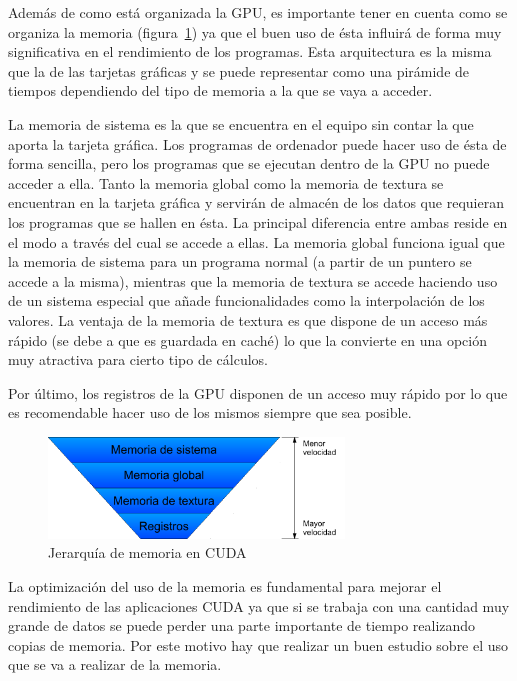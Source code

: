 Además de como está organizada la GPU, es importante tener en cuenta como se organiza la memoria (figura~\ref{fig:memcuda}) ya que el buen uso de ésta influirá de forma muy significativa en el rendimiento de los programas. Esta arquitectura es la misma que la de las tarjetas gráficas y se puede representar como una pirámide de tiempos dependiendo del tipo de memoria a la que se vaya a acceder.

La memoria de sistema es la que se encuentra en el equipo sin contar la que aporta la tarjeta gráfica. Los programas de ordenador puede hacer uso de ésta de forma sencilla, pero los programas que se ejecutan dentro de la GPU no puede acceder a ella. Tanto la memoria global como la memoria de textura se encuentran en la tarjeta gráfica y servirán de almacén de los datos que requieran los programas que se hallen en ésta. La principal diferencia entre ambas reside en el modo a través del cual se accede a ellas. La memoria global funciona igual que la memoria de sistema para un programa normal (a partir de un puntero se accede a la misma), mientras que la memoria de textura se accede haciendo uso de un sistema especial que añade funcionalidades como la interpolación de los valores. La ventaja de la memoria de textura es que dispone de un acceso más rápido (se debe a que es guardada en caché) lo que la convierte en una opción muy atractiva para cierto tipo de cálculos.

Por último, los registros de la GPU disponen de un acceso muy rápido por lo que es recomendable hacer uso de los mismos siempre que sea posible.

\begin{figure}
	\centering
	\includegraphics[width=0.7\textwidth]{images/MemoriaCuda.pdf}
	\caption{Jerarquía de memoria en CUDA}\label{fig:memcuda}
\end{figure}

La optimización del uso de la memoria es fundamental para mejorar el rendimiento de las aplicaciones CUDA ya que si se trabaja con una cantidad muy grande de datos se puede perder una parte importante de tiempo realizando copias de memoria. Por este motivo hay que realizar un buen estudio sobre el uso que se va a realizar de la memoria.


